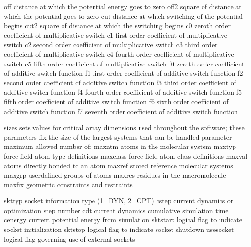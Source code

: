 \documentclass[letterpaper,11pt,english]{sphinxmanual}
\begin{document}
\begin{sphinxVerbatim}[commandchars=\\\{\}]
off             distance at which the potential energy goes to zero
off2            square of distance at which the potential goes to zero
cut             distance at which switching of the potential begins
cut2            square of distance at which the switching begins
c0              zeroth order coefficient of multiplicative switch
c1              first order coefficient of multiplicative switch
c2              second order coefficient of multiplicative switch
c3              third order coefficient of multiplicative switch
c4              fourth order coefficient of multiplicative switch
c5              fifth order coefficient of multiplicative switch
f0              zeroth order coefficient of additive switch function
f1              first order coefficient of additive switch function
f2              second order coefficient of additive switch function
f3              third order coefficient of additive switch function
f4              fourth order coefficient of additive switch function
f5              fifth order coefficient of additive switch function
f6              sixth order coefficient of additive switch function
f7              seventh order coefficient of additive switch function
\end{sphinxVerbatim}


\begin{sphinxVerbatim}[commandchars=\\\{\}]
sizes\PYGZdq{}          sets values for critical array dimensions used
throughout      the software; these parameters fix the size of
the             largest systems that can be handled
parameter       maximum allowed number of:
maxatm          atoms in the molecular system
maxtyp          force field atom type definitions
maxclass        force field atom class definitions
maxval          atoms directly bonded to an atom
maxref          stored reference molecular systems
maxgrp          user\PYGZhy{}defined groups of atoms
maxres          residues in the macromolecule
maxfix          geometric constraints and restraints
\end{sphinxVerbatim}


\begin{sphinxVerbatim}[commandchars=\\\{\}]
skttyp          socket information type (1=DYN, 2=OPT)
cstep           current dynamics or optimization step number
cdt             current dynamics cumulative simulation time
cenergy         current potential energy from simulation
sktstart        logical flag to indicate socket initialization
sktstop         logical flag to indicate socket shutdown
use\PYGZus{}socket      logical flag governing use of external sockets
\end{sphinxVerbatim}
\end{document}
